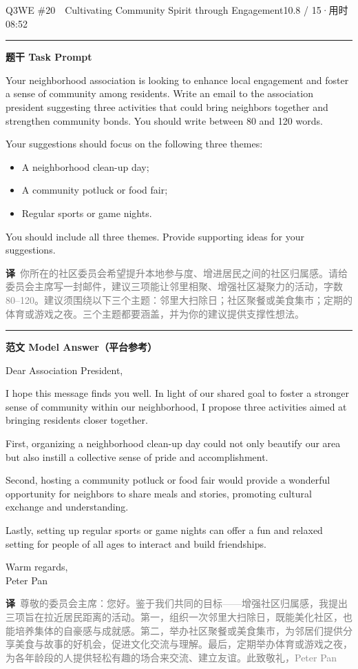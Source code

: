 \documentclass[11pt]{article}
\newcommand{\ptesub}[1]{%
  \par\needspace{2\baselineskip}\smallskip
  {\color{cAccent}\rule[-0.2ex]{3pt}{1.05em}}\hspace{6pt}%
  {\bfseries\color{cHead}#1}\par\nopagebreak\smallskip}
\newcommand{\zh}[1]{{\footnotesize\textcolor{cNote}{\textbf{译}}\ \textcolor{gray}{#1}}}
\begin{document}
\begin{qblock}{Q3\quad WE \#20\ \ Cultivating Community Spirit through Engagement}{10.8 / 15\quad·\quad 用时 08:52}

\ptesub{题干 Task Prompt}
\begin{promptbox}
Your neighborhood association is looking to enhance local engagement and foster a sense of community among residents. Write an email to the association president suggesting three activities that could bring neighbors together and strengthen community bonds. You should write between 80 and 120 words.

\smallskip Your suggestions should focus on the following three themes:
\begin{itemize}[leftmargin=1.4em,topsep=2pt,itemsep=0pt]
  \item A neighborhood clean-up day;
  \item A community potluck or food fair;
  \item Regular sports or game nights.
\end{itemize}
You should include all three themes. Provide supporting ideas for your suggestions.
\end{promptbox}
\zh{你所在的社区委员会希望提升本地参与度、增进居民之间的社区归属感。请给委员会主席写一封邮件，建议三项能让邻里相聚、增强社区凝聚力的活动，字数 80–120。建议须围绕以下三个主题：邻里大扫除日；社区聚餐或美食集市；定期的体育或游戏之夜。三个主题都要涵盖，并为你的建议提供支撑性想法。}

\ptesub{范文 Model Answer（平台参考）}
\begin{modelbox}
Dear Association President,

I hope this message finds you well. In light of our shared goal to foster a stronger sense of community within our neighborhood, I propose three activities aimed at bringing residents closer together.

First, organizing a neighborhood clean-up day could not only beautify our area but also instill a collective sense of pride and accomplishment.

Second, hosting a community potluck or food fair would provide a wonderful opportunity for neighbors to share meals and stories, promoting cultural exchange and understanding.

Lastly, setting up regular sports or game nights can offer a fun and relaxed setting for people of all ages to interact and build friendships.

Warm regards,\\ Peter Pan
\end{modelbox}
\zh{尊敬的委员会主席：您好。鉴于我们共同的目标——增强社区归属感，我提出三项旨在拉近居民距离的活动。第一，组织一次邻里大扫除日，既能美化社区，也能培养集体的自豪感与成就感。第二，举办社区聚餐或美食集市，为邻居们提供分享美食与故事的好机会，促进文化交流与理解。最后，定期举办体育或游戏之夜，为各年龄段的人提供轻松有趣的场合来交流、建立友谊。此致敬礼，Peter Pan}


\end{qblock}
\end{document}

